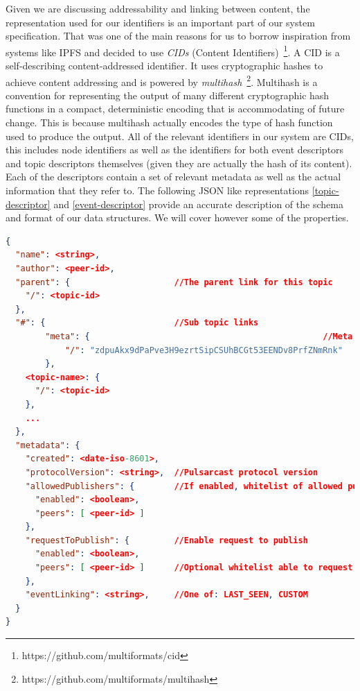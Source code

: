 Given we are discussing addressability and linking between content, the
representation used for our identifiers is an important part of our system
specification. That was one of the main reasons for us to borrow inspiration
from systems like IPFS and decided to use \emph{CIDs} (Content
Identifiers)~\footnote{https://github.com/multiformats/cid}.  A CID is a
self-describing content-addressed identifier. It uses cryptographic hashes to
achieve content addressing and is powered by
\emph{multihash}~\footnote{https://github.com/multiformats/multihash}.
Multihash is a convention for representing the output of many different
cryptographic hash functions in a compact, deterministic encoding that is
accommodating of future change. This is because multihash actually encodes the
type of hash function used to produce the output. All of the relevant
identifiers in our system are CIDs, this includes node identifiers as well as
the identifiers for both event descriptors and topic descriptors themselves
(given they are actually the hash of its content). Each of the descriptors
contain a set of relevant metadata as well as the actual information that they
refer to. The following JSON like representations \ref{topic-descriptor} and
\ref{event-descriptor} provide an accurate description of the schema and format
of our data structures. We will cover however some of the properties.

\begin{lstlisting}[float, language=JSON,caption={Topic descriptor schema in a JSON based format},label={topic-descriptor}]
{
  "name": <string>,
  "author": <peer-id>,
  "parent": {                     //The parent link for this topic
    "/": <topic-id>
  },
  "#": {                          //Sub topic links
		"meta": {												//Meta topic
			"/": "zdpuAkx9dPaPve3H9ezrtSipCSUhBCGt53EENDv8PrfZNmRnk"
		},
    <topic-name>: {
      "/": <topic-id>
    },
    ...
  },
  "metadata": {
    "created": <date-iso-8601>,
    "protocolVersion": <string>,  //Pulsarcast protocol version
    "allowedPublishers": {        //If enabled, whitelist of allowed publishers
      "enabled": <boolean>,
      "peers": [ <peer-id> ]
    },
    "requestToPublish": {         //Enable request to publish
      "enabled": <boolean>,
      "peers": [ <peer-id> ]      //Optional whitelist able to request
    },
    "eventLinking": <string>,     //One of: LAST_SEEN, CUSTOM
  }
}
\end{lstlisting}

